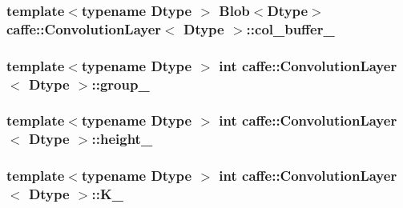 \hypertarget{classcaffe_1_1_convolution_layer_a26feaeca8bbd36a64e782ab2e12b46d2}{
\subsubsection[{col\+\_\+buffer\+\_\+}]{\setlength{\rightskip}{0pt plus 5cm}template$<$typename Dtype $>$ {\bf Blob}$<$Dtype$>$ {\bf caffe\+::\+Convolution\+Layer}$<$ Dtype $>$\+::col\+\_\+buffer\+\_\+\hspace{0.3cm}{\ttfamily [protected]}}}\label{classcaffe_1_1_convolution_layer_a26feaeca8bbd36a64e782ab2e12b46d2}
\hypertarget{classcaffe_1_1_convolution_layer_a0a6f9c53ba515998258a98d523ff72b0}{
\subsubsection[{group\+\_\+}]{\setlength{\rightskip}{0pt plus 5cm}template$<$typename Dtype $>$ int {\bf caffe\+::\+Convolution\+Layer}$<$ Dtype $>$\+::group\+\_\+\hspace{0.3cm}{\ttfamily [protected]}}}\label{classcaffe_1_1_convolution_layer_a0a6f9c53ba515998258a98d523ff72b0}
\hypertarget{classcaffe_1_1_convolution_layer_a647a6b1172a630ac5f8b8eee9ef4e7b2}{
\subsubsection[{height\+\_\+}]{\setlength{\rightskip}{0pt plus 5cm}template$<$typename Dtype $>$ int {\bf caffe\+::\+Convolution\+Layer}$<$ Dtype $>$\+::height\+\_\+\hspace{0.3cm}{\ttfamily [protected]}}}\label{classcaffe_1_1_convolution_layer_a647a6b1172a630ac5f8b8eee9ef4e7b2}
\hypertarget{classcaffe_1_1_convolution_layer_a917cf494c7845d3be0234dad754d4f49}{
\subsubsection[{K\+\_\+}]{\setlength{\rightskip}{0pt plus 5cm}template$<$typename Dtype $>$ int {\bf caffe\+::\+Convolution\+Layer}$<$ Dtype $>$\+::K\+\_\+\hspace{0.3cm}{\ttfamily [protected]}}}\label{classcaffe_1_1_convolution_layer_a917cf494c7845d3be0234dad754d4f49}
